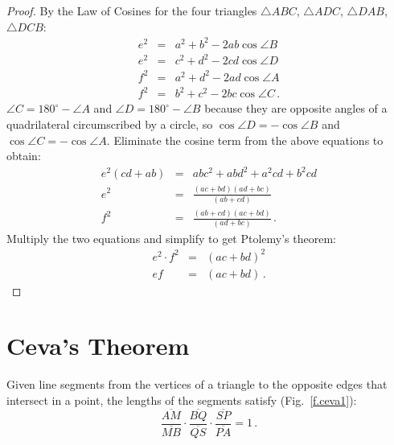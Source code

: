 \begin{proof}
By the Law of Cosines for the four triangles $\triangle ABC$, $\triangle ADC$, $\triangle DAB$, $\triangle DCB$:
\begin{eqnarray*}
e^2 &=& a^2 + b^2 - 2ab \cos \angle B\\
e^2 &=& c^2 + d^2 - 2cd \cos \angle D\\
f^2 &=& a^2 + d^2 - 2ad \cos \angle A\\
f^2 &=& b^2 + c^2 - 2bc \cos \angle C\,.
\end{eqnarray*}
$\angle C = 180^\circ - \angle A$ and $\angle D = 180^\circ - \angle B$ because they are opposite angles of a quadrilateral circumscribed by a circle, so $\cos \angle D = - \cos \angle B$ and $\cos \angle C = -\cos \angle A$. Eliminate the cosine term from the above equations to obtain:
\begin{eqnarray*}
e^2(cd+ab)&=&abc^2+abd^2+a^2cd+b^2cd\\
e^2 &=& \frac{(ac+bd)(ad+bc)}{(ab+cd)}\\
f^2 &=& \frac{(ab+cd)(ac+bd)}{(ad+bc)}\,.
\end{eqnarray*}
Multiply the two equations and simplify to get Ptolemy's theorem:
\begin{eqnarray*}
e^2\cdot f^2 &=& (ac+bd)^2\\
ef &=& (ac+bd)\,.
\end{eqnarray*}
\end{proof}


\section{Ceva's Theorem}\label{a.ceva}

\begin{theorem}[Ceva]
Given line segments from the vertices of a triangle to the opposite edges that intersect in a point, the lengths of the segments satisfy (Fig.~\ref{f.ceva1}):
\[
\frac{\overline{AM}}{\overline{MB}}\cdot\frac{\overline{BQ}}{\overline{QS}}\cdot\frac{\overline{SP}}{\overline{PA}} = 1\,.
\]
\end{theorem}

